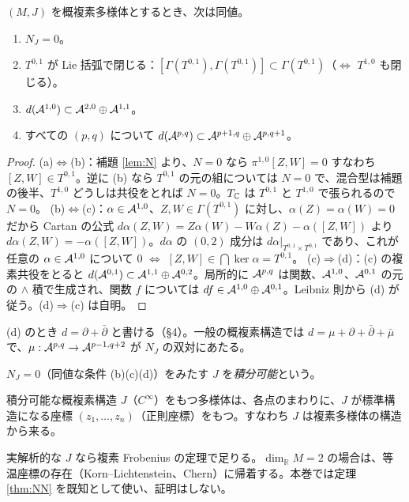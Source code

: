\begin{thm}[積分可能性の同値条件]\label{thm:integ}
$(M,J)$ を概複素多様体とするとき、次は同値。
\begin{enumerate}[label=(\alph*)]
\item $N_J=0$。
\item $T^{0,1}$ が Lie 括弧で閉じる：$[\Gamma(T^{0,1}),\Gamma(T^{0,1})]\subset\Gamma(T^{0,1})$（$\iff$ $T^{1,0}$ も閉じる）。
\item $d(\mathcal A^{1,0})\subset\mathcal A^{2,0}\oplus\mathcal A^{1,1}$。
\item すべての $(p,q)$ について $d(\mathcal A^{p,q})\subset\mathcal A^{p+1,q}\oplus\mathcal A^{p,q+1}$。
\end{enumerate}
\end{thm}
\begin{proof}\tP
(a)$\Leftrightarrow$(b)：補題 \ref{lem:N} より、$N=0$ なら $\pi^{1,0}[Z,W]=0$ すなわち $[Z,W]\in T^{0,1}$。逆に (b) なら $T^{0,1}$ の元の組については $N=0$ で、混合型は補題の後半、$T^{1,0}$ どうしは共役をとれば $N=0$。$T_{\mathbb C}$ は $T^{0,1}$ と $T^{1,0}$ で張られるので $N=0$。
(b)$\Leftrightarrow$(c)：$\alpha\in\mathcal A^{1,0}$、$Z,W\in\Gamma(T^{0,1})$ に対し、$\alpha(Z)=\alpha(W)=0$ だから Cartan の公式 $d\alpha(Z,W)=Z\alpha(W)-W\alpha(Z)-\alpha([Z,W])$ より $d\alpha(Z,W)=-\alpha([Z,W])$。$d\alpha$ の $(0,2)$ 成分は $d\alpha|_{T^{0,1}\times T^{0,1}}$ であり、これが任意の $\alpha\in\mathcal A^{1,0}$ について $0$ $\iff$ $[Z,W]\in\bigcap\ker\alpha=T^{0,1}$。
(c)$\Rightarrow$(d)：(c) の複素共役をとると $d(\mathcal A^{0,1})\subset\mathcal A^{1,1}\oplus\mathcal A^{0,2}$。局所的に $\mathcal A^{p,q}$ は関数、$\mathcal A^{1,0}$、$\mathcal A^{0,1}$ の元の $\wedge$ 積で生成され、関数 $f$ については $df\in\mathcal A^{1,0}\oplus\mathcal A^{0,1}$。Leibniz 則から (d) が従う。(d)$\Rightarrow$(c) は自明。\qedhere
\end{proof}
(d) のとき $d=\partial+\bar\partial$ と書ける（§4）。一般の概複素構造では $d=\mu+\partial+\bar\partial+\bar\mu$ で、$\mu:\mathcal A^{p,q}\to\mathcal A^{p-1,q+2}$ が $N_J$ の双対にあたる。

\begin{defn}[積分可能]
$N_J=0$（同値な条件 (b)(c)(d)）をみたす $J$ を\emph{積分可能}という。
\end{defn}

\begin{thm}\tC\label{thm:NN}
積分可能な概複素構造 $J$（$C^\infty$）をもつ多様体は、各点のまわりに、$J$ が標準構造になる座標 $(z_1,\dots,z_n)$（正則座標）をもつ。すなわち $J$ は複素多様体の構造から来る。
\end{thm}
実解析的な $J$ なら複素 Frobenius の定理で足りる。$\dim_{\mathbb R}M=2$ の場合は、等温座標の存在（Korn--Lichtenstein、Chern）に帰着する\tQ。本巻では定理 \ref{thm:NN} を既知として使い、証明はしない。

